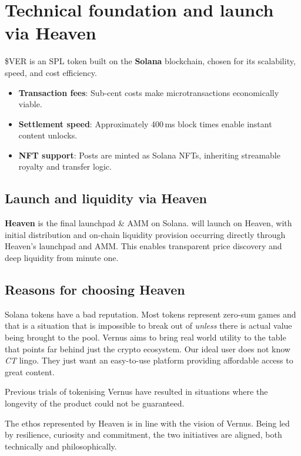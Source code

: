 \documentclass[10pt]{article}
\begin{document}
  \section{Technical foundation and launch via Heaven}
    \$VER is an SPL token built on the \textbf{Solana} blockchain, chosen for its scalability, speed, and cost efficiency.
    \begin{itemize}[leftmargin=*]
      \item \textbf{Transaction fees}: Sub-cent costs make microtransactions economically viable.
      \item \textbf{Settlement speed}: Approximately 400\,ms block times enable instant content unlocks.
      \item \textbf{NFT support}: Posts are minted as Solana NFTs, inheriting streamable royalty and transfer logic.
    \end{itemize}

    \subsection{Launch and liquidity via Heaven}
      \textbf{Heaven} is the final launchpad \& AMM on Solana. \textbf{\tokenticker{}} will launch on Heaven, with initial distribution and on-chain liquidity provision occurring directly through Heaven's launchpad and AMM. This enables transparent price discovery and deep liquidity from minute one.

    \subsection{Reasons for choosing Heaven}
      Solana tokens have a bad reputation. Most tokens represent zero-sum games and that is a situation that is impossible to break out of \textit{unless} there is actual value being brought to the pool. Vernus aims to bring real world utility to the table that points far behind just the crypto ecosystem. Our ideal user does not know \textit{CT} lingo. They just want an easy-to-use platform providing affordable access to great content.

      Previous trials of tokenising Vernus have resulted in situations where the longevity of the product could not be guaranteed.

      The ethos represented by Heaven is in line with the vision of Vernus. Being led by resilience, curiosity and commitment, the two initiatives are aligned, both technically and philosophically.
\end{document}
